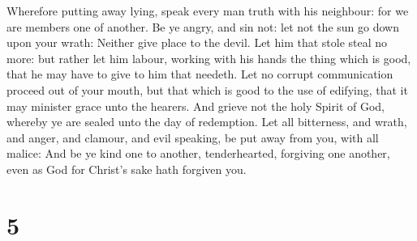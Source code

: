  Wherefore putting away lying, speak every man truth with
his neighbour: for we are members one of another.  Be ye
angry, and sin not: let not the sun go down upon your wrath:
 Neither give place to the devil.  Let him
that stole steal no more: but rather let him labour, working with his
hands the thing which is good, that he may have to give to him that
needeth.  Let no corrupt communication proceed out of your
mouth, but that which is good to the use of edifying, that it may
minister grace unto the hearers.  And grieve not the holy
Spirit of God, whereby ye are sealed unto the day of redemption.
 Let all bitterness, and wrath, and anger, and clamour, and
evil speaking, be put away from you, with all malice:  And
be ye kind one to another, tenderhearted, forgiving one another, even as
God for Christ's sake hath forgiven you.

\hypertarget{section-4}{%
\section{5}\label{section-4}}

